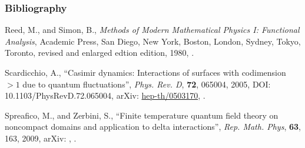 \documentclass[10pt,t]{beamer}
\begin{document}
\begin{frame}
  \frametitle{Bibliography}


  \begin{thebibliography}{99}

   Reed,
    M., and Simon, B., \emph{Methods of Modern Mathematical Physics I:
      Functional Analysis}, Academic Press, San Diego, New York,
    Boston, London, Sydney, Tokyo, Toronto, revised and enlarged
    edtion edition, 1980,
    \cite{ReedSimonMethodsOfModernMathematicalPhysicsVolI1980}.

   Scardicchio, A., ``Casimir
    dynamics: Interactions of surfaces with codimension $> 1$ due to
    quantum fluctuations'', \emph{Phys. Rev. D}, \textbf{72}, 065004,
    2005, DOI: 10.1103/PhysRevD.72.065004, arXiv:
    \href{https://arxiv.org/abs/hep-th/0503170}{hep-th/0503170},
    \cite{ScardicchioCasimirDynamics2005}.

    Spreafico, M., and Zerbini, S., ``Finite temperature quantum field
    theory on noncompact domains and application to delta
    interactions'', \emph{Rep. Math. Phys}, \textbf{63}, 163, 2009,
    arXiv: ,
    \cite{SpreaficoZerbiniFiniteTemperatureQFTOnNoncompactDomains2009}.

  \end{thebibliography}

\end{frame}







{}










\end{document}

